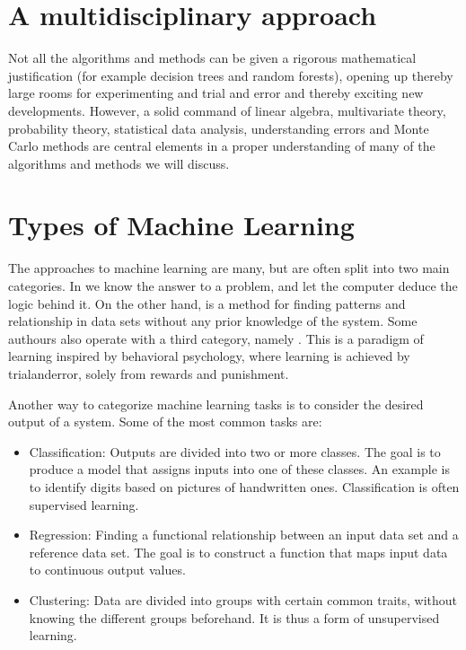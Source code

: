 \documentclass[letterpaper,10pt,english]{sphinxmanual}
\begin{document}
\chapter{A multidisciplinary approach}
\label{\detokenize{chapter1:a-multidisciplinary-approach}}
Not all the
algorithms and methods can be given a rigorous mathematical
justification (for example decision trees and random forests), opening up thereby large rooms for experimenting and
trial and error and thereby exciting new developments.  However, a
solid command of linear algebra, multivariate theory, probability
theory, statistical data analysis, understanding errors and Monte
Carlo methods are central elements in a proper understanding of many
of the algorithms and methods we will discuss.


\chapter{Types of Machine Learning}
\label{\detokenize{chapter1:types-of-machine-learning}}
The approaches to machine learning are many, but are often split into
two main categories.  In  we know the answer to a
problem, and let the computer deduce the logic behind it. On the other
hand,  is a method for finding patterns and
relationship in data sets without any prior knowledge of the system.
Some authours also operate with a third category, namely
. This is a paradigm of learning inspired by
behavioral psychology, where learning is achieved by trial\sphinxhyphen{}and\sphinxhyphen{}error,
solely from rewards and punishment.

Another way to categorize machine learning tasks is to consider the
desired output of a system.  Some of the most common tasks are:
\begin{itemize}
\item {} 
Classification: Outputs are divided into two or more classes. The goal is to   produce a model that assigns inputs into one of these classes. An example is to identify  digits based on pictures of hand\sphinxhyphen{}written ones. Classification is often supervised learning.

\item {} 
Regression: Finding a functional relationship between an input data set and a reference data set.   The goal is to construct a function that maps input data to continuous output values.

\item {} 
Clustering: Data are divided into groups with certain common traits, without knowing the different groups beforehand.  It is thus a form of unsupervised learning.

\end{itemize}
\end{document}

